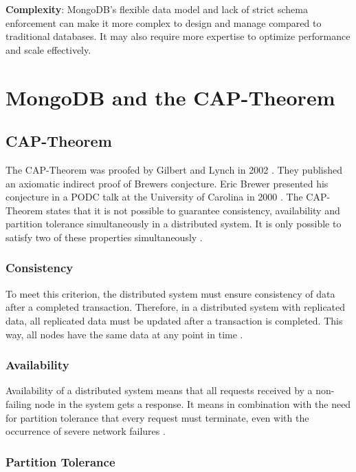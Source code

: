 \textbf{Complexity}: MongoDB's flexible data model and lack of strict schema enforcement can make it more complex to design and manage compared to traditional databases. It may also require more expertise to optimize performance and scale effectively.

\section{MongoDB and the CAP-Theorem}

\subsection{CAP-Theorem}

The \ac{CAP}-Theorem was proofed by Gilbert and Lynch in 2002 \parencite{brewer:2002}. They published an axiomatic indirect proof of Brewers conjecture. Eric Brewer presented his conjecture in a \ac{PODC} talk at the University of Carolina in 2000 \parencite{brewer2000towards}. The \ac{CAP}-Theorem states that it is not possible to guarantee consistency, availability and partition tolerance simultaneously in a distributed system. It is only possible to satisfy two of these properties simultaneously \parencite[1]{brewer:2002}.

\subsubsection*{Consistency}

To meet this criterion, the distributed system must ensure consistency of data after a completed transaction. Therefore, in a distributed system with replicated data, all replicated data must be updated after a transaction is completed. This way, all nodes have the same data at any point in time \parencite[2\psqq]{brewer:2002}.

\subsubsection*{Availability}

Availability of a distributed system means that all requests received by a non-failing node in the system gets a response. It means in combination with the need for partition tolerance that every request must terminate, even with the occurrence of severe network failures \parencite[3]{brewer:2002}.

\subsubsection*{Partition Tolerance}

